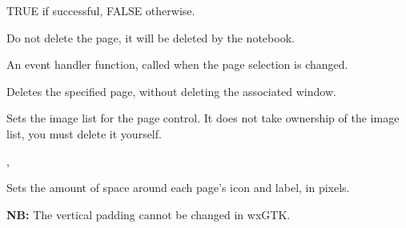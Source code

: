


TRUE if successful, FALSE otherwise.


Do not delete the page, it will be deleted by the notebook.



\label{wxnotebookonselchange}


An event handler function, called when the page selection is changed.



\label{wxnotebookremovepage}


Deletes the specified page, without deleting the associated window.

\label{wxnotebooksetimagelist}


Sets the image list for the page control. It does not take
ownership of the image list, you must delete it yourself.


,

\label{wxnotebooksetpadding}


Sets the amount of space around each page's icon and label, in pixels.

{\bf NB:} The vertical padding cannot be changed in wxGTK.

\label{wxnotebooksetpagesize}


